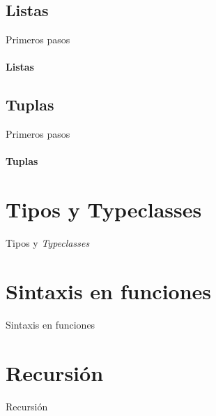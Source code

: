 \documentclass{beamer}
\begin{document}
\subsection{Listas}
\begin{frame}{Primeros pasos}      %
  \framesubtitle{Listas}

\end{frame}

\subsection{Tuplas}
\begin{frame}{Primeros pasos}      %
  \framesubtitle{Tuplas}

\end{frame}

\section{Tipos y Typeclasses}
\begin{frame}{Tipos y \emph{Typeclasses}}      %

\end{frame}

\section{Sintaxis en funciones}
\begin{frame}{Sintaxis en funciones}      %

\end{frame}

\section{Recursión}
\begin{frame}{Recursión}      %

\end{frame}
\end{document}
